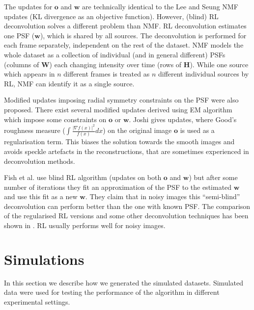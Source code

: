 The updates for $\bm{o}$ and $\bm{w}$ are technically identical to the Lee and Seung NMF updates (KL divergence as an objective function). However, (blind) RL deconvolution solves a different problem than NMF. RL deconvolution estimates one PSF ($\bm{w}$), which is shared by all sources. The deconvolution is performed for each frame separately, independent on the rest of the dataset. NMF models the whole dataset as a collection of individual (and in general different) PSFs (columns of $\bm{W}$) each changing intensity over time (rows of $\bm{H}$). While one source which appears in $n$ different frames is treated as $n$ different individual sources by RL, NMF can identify it as a single source. 

Modified updates imposing radial symmetry constraints on the PSF were also proposed. There exist several modified updates derived using EM algorithm which impose some constraints on $\bm{o}$ or $\bm{w}$. Joshi \cite{Joshi:93} gives updates, where Good's roughness measure ($\int\frac{\left|\nabla f(x)\right|^2}{f(x)}dx$) on the original image $\bm{o}$ is used as a regularisation term. This biases the solution towards the smooth images and avoids speckle artefacts in the reconstructions, that are sometimes experienced in deconvolution methods. 

Fish et al. \cite{Fish1995} use blind RL algorithm (updates on both $\bm{o}$ and $\bm{w}$) but after some number of iterations they fit an approximation of the PSF to the estimated $\bm{w}$ and use this fit as a new $\bm{w}$. They claim that in noisy images this ``semi-blind'' deconvolution can perform better than the one with known PSF. The comparison of the regularised RL versions and some other deconvolution techniques has been shown in \cite{Kempen1997BA,Verveer1999}. RL usually performs well for noisy images.
\afterpage{\clearpage}

\section{Simulations \label{sec:simulations}}
In this section we describe how we generated the simulated datasets. Simulated data were used for testing the performance of the algorithm in different experimental settings.

